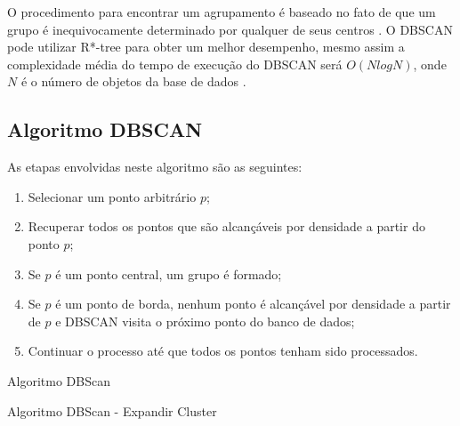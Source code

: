 O procedimento para encontrar um agrupamento é baseado no fato de que um grupo é
inequivocamente determinado por qualquer de seus centros \cite{ESTER1998}. 
O DBSCAN pode utilizar R*-tree para obter um melhor desempenho, mesmo assim  a complexidade média do tempo de execução do DBSCAN será ${O (N logN)}$, onde ${N}$ é o número de objetos da base de dados \cite{Sheikholeslami1998}.

\subsection{Algoritmo DBSCAN}

As etapas envolvidas neste algoritmo são as seguintes:

\begin{enumerate}
	\item Selecionar um ponto arbitrário ${p}$;
	\item Recuperar todos os pontos que são alcançáveis por densidade a partir do ponto ${p}$;
	\item Se ${p}$ é um ponto central, um grupo é formado;
	\item Se ${p}$ é um ponto de borda, nenhum ponto é alcançável por densidade a partir de ${p}$ e DBSCAN visita o próximo ponto do banco de dados;
	\item Continuar o processo até que todos os pontos tenham sido processados.
\end{enumerate}


\begin{algorithm}[h!]
	\SetSpacedAlgorithm
	\caption{\label{alg:algoritmo_dbscan}Algoritmo DBScan}
\end{algorithm}

\begin{algorithm}[h!]
	\SetSpacedAlgorithm
	\caption{\label{alg:algoritmo_dbscan_exp}Algoritmo DBScan - Expandir Cluster}
\end{algorithm}


